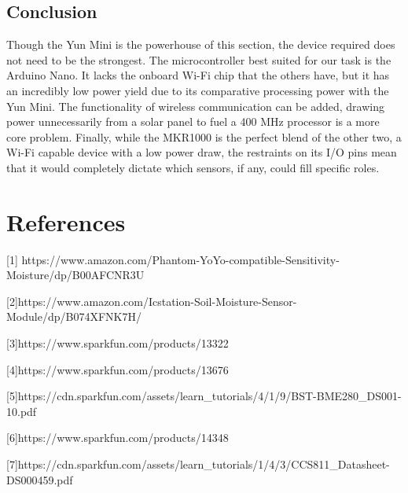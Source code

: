 \documentclass[IEEEtran,letterpaper,10pt,titlepage,fleqn,draftclsnofoot,onecolumn]{article}
\begin{document}
\subsection{Conclusion}

Though the Yun Mini is the powerhouse of this section, the device required does not need to be the strongest. The microcontroller best suited for our task is the Arduino Nano. It lacks the onboard Wi-Fi chip that the others have, but it has an incredibly low power yield due to its comparative processing power with the Yun Mini. The functionality of wireless communication can be added, drawing power unnecessarily from a solar panel to fuel a 400 MHz processor is a more core problem. Finally, while the MKR1000 is the perfect blend of the other two, a Wi-Fi capable device with a low power draw, the restraints on its I/O pins mean that it would completely dictate which sensors, if any, could fill specific roles.

\clearpage

\section{References}
[1] https://www.amazon.com/Phantom-YoYo-compatible-Sensitivity-Moisture/dp/B00AFCNR3U

\vspace{1mm}

[2]https://www.amazon.com/Icstation-Soil-Moisture-Sensor-Module/dp/B074XFNK7H/

\vspace{1mm}

[3]https://www.sparkfun.com/products/13322

\vspace{1mm}

[4]https://www.sparkfun.com/products/13676

\vspace{1mm}

[5]https://cdn.sparkfun.com/assets/learn\_tutorials/4/1/9/BST-BME280\_DS001-10.pdf

\vspace{1mm}

[6]https://www.sparkfun.com/products/14348

\vspace{1mm}

[7]https://cdn.sparkfun.com/assets/learn\_tutorials/1/4/3/CCS811\_Datasheet-DS000459.pdf

\vspace{1mm}
\end{document}
